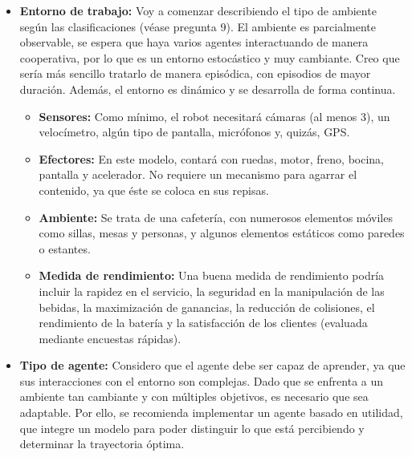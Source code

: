 \begin{itemize}
    \item \textbf{Entorno de trabajo:}  
    Voy a comenzar describiendo el tipo de ambiente según las clasificaciones (véase pregunta 9). El ambiente es parcialmente observable, se espera que haya varios agentes interactuando de manera cooperativa, por lo que es un entorno estocástico y muy cambiante. Creo que sería más sencillo tratarlo de manera episódica, con episodios de mayor duración. Además, el entorno es dinámico y se desarrolla de forma continua.
    \begin{itemize}
        \item \textbf{Sensores:}  
        Como mínimo, el robot necesitará cámaras (al menos 3), un velocímetro, algún tipo de pantalla, micrófonos y, quizás, GPS.
        \item \textbf{Efectores:}  
        En este modelo, contará con ruedas, motor, freno, bocina, pantalla y acelerador. No requiere un mecanismo para agarrar el contenido, ya que éste se coloca en sus repisas.
        \item \textbf{Ambiente:}  
        Se trata de una cafetería, con numerosos elementos móviles como sillas, mesas y personas, y algunos elementos estáticos como paredes o estantes.
        \item \textbf{Medida de rendimiento:}  
        Una buena medida de rendimiento podría incluir la rapidez en el servicio, la seguridad en la manipulación de las bebidas, la maximización de ganancias, la reducción de colisiones, el rendimiento de la batería y la satisfacción de los clientes (evaluada mediante encuestas rápidas).
    \end{itemize}
    
    \item \textbf{Tipo de agente:}  
    Considero que el agente debe ser capaz de aprender, ya que sus interacciones con el entorno son complejas. Dado que se enfrenta a un ambiente tan cambiante y con múltiples objetivos, es necesario que sea adaptable. Por ello, se recomienda implementar un agente basado en utilidad, que integre un modelo para poder distinguir lo que está percibiendo y determinar la trayectoria óptima.
\end{itemize}
